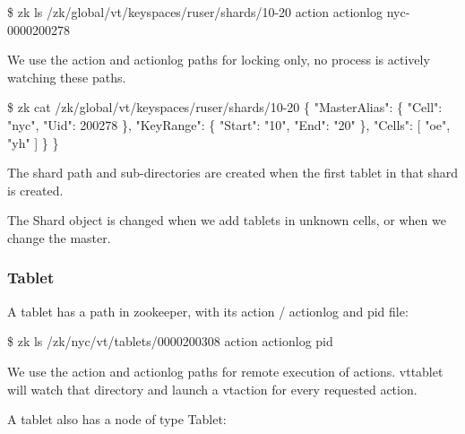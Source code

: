 \begin{codesample2}
  \$ zk ls /zk/global/vt/keyspaces/ruser/shards/10-20
  action
  actionlog
  nyc-0000200278
\end{codesample2}


We use the action and actionlog paths for locking only, no process is actively watching these paths.

\begin{codesample2}
  \$ zk cat /zk/global/vt/keyspaces/ruser/shards/10-20
    \{
     "MasterAlias": \{
       "Cell": "nyc",
       "Uid": 200278
     \},
     "KeyRange": \{
       "Start": "10",
       "End": "20"
     \},
    "Cells": [
       "oe",
       "yh"
    ]
    \}
  \}
\end{codesample2}

The shard path and sub-directories are created when the first tablet in that shard is created.

The Shard object is changed when we add tablets in unknown cells, or when we change the master.

\subsubsection{Tablet}

A tablet has a path in zookeeper, with its action / actionlog and pid file:
\begin{codesample2}
  \$ zk ls /zk/nyc/vt/tablets/0000200308
  action
  actionlog
  pid
\end{codesample2}

We use the action and actionlog paths for remote execution of actions. vttablet will watch that directory and launch a vtaction for every requested action.

A tablet also has a node of type Tablet:

